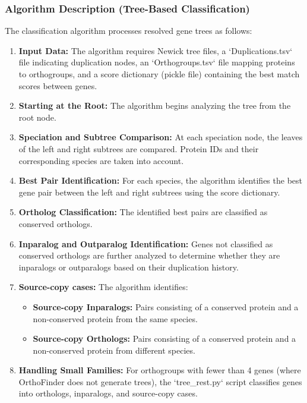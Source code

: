 \documentclass{article}
\begin{document}
\subsubsection{Algorithm Description (Tree-Based Classification)}
The classification algorithm processes resolved gene trees as follows:
\begin{enumerate}
    \item \textbf{Input Data:} The algorithm requires Newick tree files, a `Duplications.tsv` file indicating duplication nodes, an `Orthogroups.tsv` file mapping proteins to orthogroups, and a score dictionary (pickle file) containing the best match scores between genes.
    \item \textbf{Starting at the Root:} The algorithm begins analyzing the tree from the root node.
    \item \textbf{Speciation and Subtree Comparison:} At each speciation node, the leaves of the left and right subtrees are compared. Protein IDs and their corresponding species are taken into account.
    \item \textbf{Best Pair Identification:} For each species, the algorithm identifies the best gene pair between the left and right subtrees using the score dictionary.
    \item \textbf{Ortholog Classification:} The identified best pairs are classified as conserved orthologs.
    \item \textbf{Inparalog and Outparalog Identification:} Genes not classified as conserved orthologs are further analyzed to determine whether they are inparalogs or outparalogs based on their duplication history.
    \item \textbf{Source-copy cases:} The algorithm identifies:
    \begin{itemize}
        \item \textbf{Source-copy Inparalogs:} Pairs consisting of a conserved protein and a non-conserved protein from the same species.
        \item \textbf{Source-copy Orthologs:} Pairs consisting of a conserved protein and a non-conserved protein from different species.
    \end{itemize}
    \item \textbf{Handling Small Families:} For orthogroups with fewer than 4 genes (where OrthoFinder does not generate trees), the `tree\_rest.py` script classifies genes into orthologs, inparalogs, and source-copy cases.
\end{enumerate}
\end{document}
